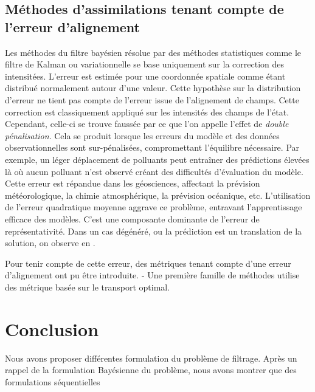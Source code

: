 \subsection{Méthodes d'assimilations tenant compte de l'erreur d'alignement}
Les méthodes du filtre bayésien résolue par des méthodes statistiques comme le filtre de Kalman ou variationnelle se base uniquement sur la correction des intensitées. L'erreur est estimée pour une coordonnée spatiale comme étant distribué normalement autour d'une valeur. Cette hypothèse sur la distribution d'erreur ne tient pas compte de l'erreur issue de l'alignement de champs. Cette correction est classiquement appliqué sur les intensités des champs de l'état. Cependant, celle-ci se trouve faussée par ce que l'on appelle l'effet de \textit{double pénalisation}.
Cela se produit lorsque les erreurs du modèle et des données observationnelles sont sur-pénalisées, compromettant l'équilibre nécessaire. Par exemple, un léger déplacement de polluants peut entraîner des prédictions élevées là où aucun polluant n'est observé  créant des difficultés d'évaluation du modèle. Cette erreur est répandue dans les géosciences, affectant la prévision météorologique, la chimie atmosphérique, la prévision océanique, etc. L'utilisation de l'erreur quadratique moyenne aggrave ce problème, entravant l'apprentissage efficace des modèles. C'est une composante dominante de l'erreur de représentativité. Dans un cas dégénéré, ou la prédiction est un translation de la solution, on observe en .

Pour tenir compte de cette erreur, des métriques tenant compte d'une erreur d'alignement ont pu être introduite.
- Une première famille de méthodes utilise des métrique basée sur le transport optimal.

\section{Conclusion}


Nous avons proposer différentes formulation du problème de filtrage. Après un rappel de la formulation Bayésienne du problème, nous avons montrer que des formulations séquentielles